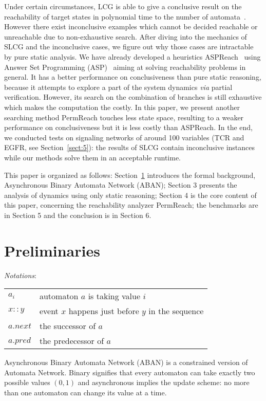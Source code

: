 \documentclass[runningheads]{llncs}
\begin{document}
Under certain circumstances, LCG is able to give a conclusive result on the reachability of target states in polynomial time to the number of automata~\cite{pauleve2016goal}. 
However there exist inconclusive examples which cannot be decided reachable or unreachable due to non-exhaustive search.
After diving into the mechanics of SLCG and the inconclusive cases, we figure out why those cases are intractable by pure static analysis. 
We have already developed a heuristics ASPReach~\cite{chai2018reach} using Answer Set Programming (ASP)~\cite{baral2003knowledge} aiming at solving reachability problems in general. 
It has a better performance on conclusiveness than pure static reasoning, because it attempts to explore a part of the system dynamics \textit{via} partial verification.
However, its search on the combination of branches is still exhaustive which makes the computation the costly.
In this paper, we present another searching method PermReach touches less state space, resulting to a weaker performance on conclusiveness but it is less costly than ASPReach.
In the end, we conducted tests on signaling networks of around 100 variables (TCR and EGFR, see Section~\ref{sect:5}): the results of SLCG contain inconclusive instances~\cite{folschette2015} while our methods solve them in an acceptable runtime.

This paper is organized as follows: Section~\ref{sect:preliminaries} introduces the formal background, Asynchronous Binary Automata Network (ABAN); Section 3 presents the analysis of dynamics using only static reasoning; 
Section 4 is the core content of this paper, concerning the reachability analyzer PermReach;
the benchmarks are in Section 5 and the conclusion is in Section 6.
\section{Preliminaries}\label{sect:preliminaries}
\textit{Notations}:

\begin{tabular}{l|l}
$a_i$& automaton $a$ is taking value $i$\\

$x::y$& event $x$ happens just before $y$ in the sequence\\

$a.next$& the successor of $a$\\ $a.pred$& the predecessor of $a$
\end{tabular}

Asynchronous Binary Automata Network (ABAN) is a constrained version of Automata Network.
Binary signifies that every automaton can take exactly two possible values $(0,1)$ and asynchronous implies the update scheme: no more than one automaton can change its value at a time. 
\end{document}
